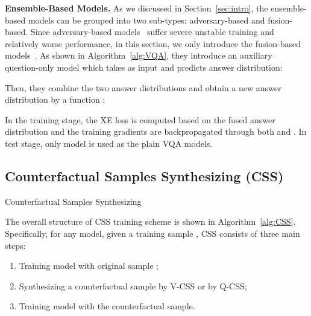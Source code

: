 \documentclass[10pt,twocolumn,letterpaper]{article}
\begin{document}
\noindent\textbf{Ensemble-Based Models.} As we discussed in Section~\ref{sec:intro}, the ensemble-based models can be grouped into two sub-types: adversary-based and fusion-based. Since adversary-based models~\cite{ramakrishnan2018overcoming, grand2019adversarial, belinkov2019don} suffer severe unstable training and relatively worse performance, in this section, we only introduce the fusion-based models~\cite{cadene2019rubi, clark2019don, mahabadi2019simple}. As shown in Algorithm~\ref{alg:VQA}, they introduce an auxiliary question-only model  which takes  as input and predicts answer distribution:


Then, they combine the two answer distributions and obtain a new answer distribution  by a function :

In the training stage, the XE loss is computed based on the fused answer distribution  and the training gradients are backpropagated through both  and . In test stage, only model  is used as the plain VQA models.


\subsection{Counterfactual Samples Synthesizing (CSS)} \label{sec:3.2}

\begin{algorithm}[tbp]
	\caption{Counterfactual Samples Synthesizing}\label{alg:CSS}
	\begin{algorithmic}[1]
		\Function {}{}
		\State 
		\State 
		\If {}  
			\State 
			\State 
			\State 
			\State 
			\State 
		\Else {}
			\State 
			\State 
			\State 
			\State 
		\EndIf
		\EndFunction
	\end{algorithmic}
\end{algorithm}

The overall structure of CSS training scheme is shown in Algorithm~\ref{alg:CSS}. Specifically, for any  model, given a training sample , CSS consists of three main steps: 
\begin{enumerate}
	\vspace{-0.6em}
	\itemsep -0.2em
	\item Training  model with original sample ;
	\item Synthesizing a counterfactual sample  by V-CSS or  by Q-CSS;
	\item Training  model with the counterfactual sample.
	\vspace{-0.6em}
\end{enumerate}
\end{document}
